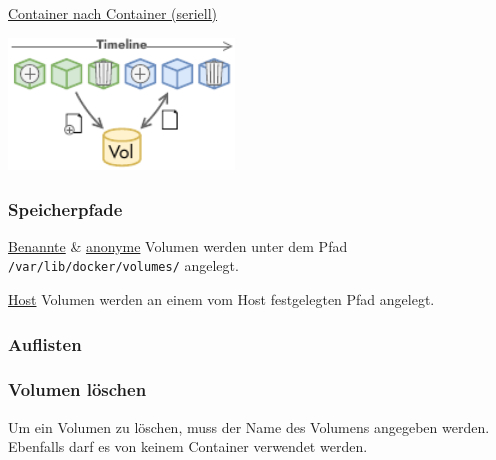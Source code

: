 \documentclass[
  10pt,
  a4paper,
]{article}
\newenvironment{Shaded}{}{}
\newcommand{\ExtensionTok}[1]{\textcolor[rgb]{0.84,0.23,0.29}{\textbf{#1}}}
\newcommand{\NormalTok}[1]{\textcolor[rgb]{0.14,0.16,0.18}{#1}}
\newcommand{\OperatorTok}[1]{\textcolor[rgb]{0.14,0.16,0.18}{#1}}
\newcommand*\circled[1]{\tikz[baseline=(char.base)]{
          \node[shape=circle,draw,inner sep=1pt] (char) {{\scriptsize#1}};}}
\begin{document}
\begin{multicols*}{2}
\circled{3} \ul{Container nach Container (seriell)}

\begin{center}
\includegraphics[width=6cm,height=\textheight]{images/docker/volume_exchange_series.pdf}
\end{center}

\subsubsection{Speicherpfade}\label{speicherpfade}

\ul{Benannte} \& \ul{anonyme} Volumen werden unter dem Pfad
\texttt{/var/lib/docker/volumes/} angelegt.

\ul{Host} Volumen werden an einem vom Host festgelegten Pfad angelegt.

\subsubsection{\texorpdfstring{{\small \faTerminal\hspace{1mm}}
Auflisten}{ Auflisten}}\label{auflisten-2}

\begin{Shaded}
\end{Shaded}

\subsubsection{\texorpdfstring{{\small \faTerminal\hspace{1mm}} Volumen
löschen}{ Volumen löschen}}\label{volumen-luxf6schen}

Um ein Volumen zu löschen, muss der Name des Volumens angegeben werden.
Ebenfalls darf es von keinem Container verwendet werden.

\begin{Shaded}
\end{Shaded}


\end{multicols*}
\end{document}
